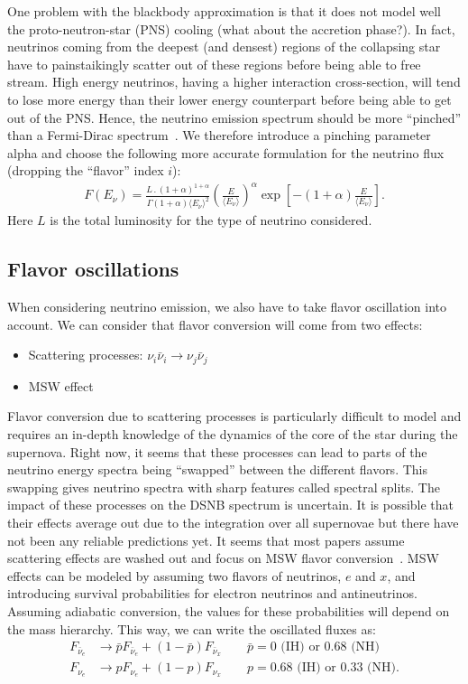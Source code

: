 \documentclass[12pt]{article}
\begin{document}
One problem with the blackbody approximation is that it does not model well the proto-neutron-star (PNS) cooling (what about the accretion phase?). In fact, neutrinos coming from the deepest (and densest) regions of the collapsing star have to painstaikingly scatter out of these regions before being able to free stream. High energy neutrinos, having a higher interaction cross-section, will tend to lose more energy than their lower energy counterpart before being able to get out of the PNS. Hence, the neutrino emission spectrum should be more ``pinched'' than a Fermi-Dirac spectrum~\cite{Lunardini:2012ne}. We therefore introduce a pinching parameter alpha and choose the following more accurate formulation for the neutrino flux (dropping the ``flavor'' index $i$):
\begin{align}
    F(E_\nu) = \frac{L \,.\, (1 + \alpha)^{1 + \alpha}}{\Gamma(1 + \alpha)\langle E_\nu\rangle^2}\left(\frac{E}{\langle E_\nu \rangle}\right)^\alpha \exp\left[-(1 + \alpha)\frac{E}{\langle E_\nu \rangle}\right].
    \label{eq:pinched}
\end{align}
Here $L$ is the total luminosity for the type of neutrino considered.
\subsection{Flavor oscillations}
When considering neutrino emission, we also have to take flavor oscillation into account. We can consider that flavor conversion will come from two effects:
\begin{itemize}
    \item Scattering processes: $\nu_i \bar{\nu}_i\rightarrow \nu_j \bar{\nu}_j$
    \item MSW effect
\end{itemize}
Flavor conversion due to scattering processes is particularly difficult to model and requires an in-depth knowledge of the dynamics of the core of the star during the supernova. Right now, it seems that these processes can lead to parts of the neutrino energy spectra being ``swapped'' between the different flavors. This swapping gives neutrino spectra with sharp features called spectral splits. The impact of these processes on the DSNB spectrum is uncertain. It is possible that their effects average out due to the integration over all supernovae but there have not been any reliable predictions yet. It seems that most papers assume scattering effects are washed out and focus on MSW flavor conversion~\cite{Lunardini:2012ne}. MSW effects can be modeled by assuming two flavors of neutrinos, $e$ and $x$, and introducing survival probabilities for electron neutrinos and antineutrinos. Assuming adiabatic conversion, the values for these probabilities will depend on the mass hierarchy. This way, we can write the oscillated fluxes as:
\begin{align}
    F_{\bar{\nu}_e} &\rightarrow \bar{p} F_{\bar{\nu}_e} + (1 - \bar{p}) F_{\bar{\nu}_x}\quad\quad \bar{p} = 0\text{ (IH) or }0.68\text{ (NH)}\\
    F_{\nu_e} &\rightarrow p F_{\nu_e} + (1 - p) F_{\nu_x}\quad\quad p = 0.68\text{ (IH) or }0.33\text{ (NH)}.
    \label{eq:flavor}
\end{align}
\end{document}
